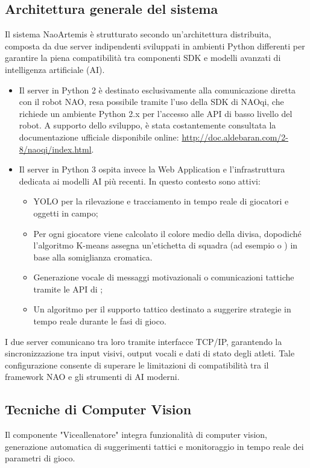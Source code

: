 \documentclass{optica-article}
\begin{document}
\subsection{Architettura generale del sistema}
Il sistema NaoArtemis è strutturato secondo un’architettura distribuita, composta da due server indipendenti sviluppati in ambienti Python differenti per garantire la piena compatibilità tra componenti SDK e modelli avanzati di intelligenza artificiale (AI).

\begin{itemize}
 \item Il server in Python 2 è destinato esclusivamente alla comunicazione diretta con il robot NAO, resa possibile tramite l’uso della SDK di NAOqi, che richiede un ambiente Python 2.x per l’accesso alle API di basso livello del robot. A supporto dello sviluppo, è stata costantemente consultata la documentazione ufficiale disponibile online: \url{http://doc.aldebaran.com/2-8/naoqi/index.html}.

  
  \item Il server in Python 3 ospita invece la Web Application e l’infrastruttura dedicata ai modelli AI più recenti. In questo contesto sono attivi:
  \begin{itemize}
    \item YOLO per la rilevazione e tracciamento in tempo reale di giocatori e oggetti in campo;
    \item Per ogni giocatore viene calcolato il colore medio della divisa, dopodiché l'algoritmo K-means assegna un'etichetta di squadra (ad esempio  o ) in base alla somiglianza cromatica.
    \item Generazione vocale di messaggi motivazionali o comunicazioni tattiche tramite le API  di ;
    \item Un algoritmo per il supporto tattico destinato a suggerire strategie in tempo reale durante le fasi di gioco.
  \end{itemize}
\end{itemize}

I due server comunicano tra loro tramite interfacce TCP/IP, garantendo la sincronizzazione tra input visivi, output vocali e dati di stato degli atleti. Tale configurazione consente di superare le limitazioni di compatibilità tra il framework NAO e gli strumenti di AI moderni.

\subsection{Tecniche di Computer Vision}
Il componente "Viceallenatore" integra funzionalità di computer vision, generazione automatica di suggerimenti tattici e monitoraggio in tempo reale dei parametri di gioco.
\end{document}

